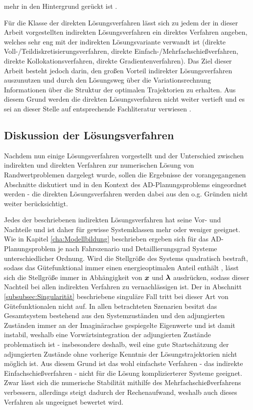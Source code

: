 mehr in den Hintergrund gerückt ist \cite{Papageorgiou.2012}. 

Für die Klasse der direkten Lösungsverfahren lässt sich zu jedem der in dieser Arbeit vorgestellten indirekten Lösungsverfahren ein direktes Verfahren angeben, welches sehr eng mit der indirekten Lösungsvariante verwandt ist (direkte Voll-/Teildiskretisierungsverfahren, direkte Einfach-/Mehrfachschießverfahren, direkte Kollokationsverfahren, direkte Gradientenverfahren). Das Ziel dieser Arbeit besteht jedoch darin, den großen Vorteil indirekter Lösungsverfahren auszunutzen und durch den Lösungsweg über die Variationsrechnung Informationen über die Struktur der optimalen Trajektorien zu erhalten. Aus diesem Grund werden die direkten Lösungsverfahren nicht weiter vertieft und es sei an dieser Stelle auf entsprechende Fachliteratur verwiesen \cite{KnutGraichen.2012,Gerdts.2010,Papageorgiou.2012,Ascher.1995c4,Ascher.1995c5,Betts.1998,Cervantes.2009}.
\subsection{Diskussion der Lösungsverfahren}\label{subsec:Diskussion}
Nachdem nun einige Lösungsverfahren vorgestellt und der Unterschied zwischen indirekten und direkten Verfahren zur numerischen Lösung von Randwertproblemen dargelegt wurde, sollen die Ergebnisse der vorangegangenen Abschnitte diskutiert und in den Kontext des \gls{AD}-Planungsproblems eingeordnet werden - die direkten Lösungsverfahren werden dabei aus den o.g. Gründen nicht weiter berücksichtigt. 

Jedes der beschriebenen indirekten Lösungsverfahren hat seine Vor- und Nachteile und ist daher für gewisse Systemklassen mehr oder weniger geeignet. Wie in Kapitel \ref{cha:Modellbildung} beschrieben ergeben sich für das \gls{AD}-Planungsproblem je nach Fahrszenario und Detaillierungsgrad Systeme unterschiedlicher Ordnung. Wird die Stellgröße des Systems quadratisch bestraft, sodass das Gütefunktional immer einen energieoptimalen Anteil enthält \cite{KnutGraichen.2012}, lässt sich die Stellgröße immer in Abhängigkeit von $\boldsymbol{x}$ und $\boldsymbol{\lambda}$ ausdrücken, sodass dieser Nachteil bei allen indirekten Verfahren zu vernachlässigen ist. Der in Abschnitt \ref{subsubsec:Singularität} beschriebene singuläre Fall tritt bei dieser Art von Gütefunktionalen nicht auf. In allen betrachteten Szenarien besitzt das Gesamtsystem bestehend aus den Systemzuständen und den adjungierten Zuständen immer an der Imaginärachse gespiegelte Eigenwerte und ist damit instabil, weshalb eine Vorwärtsintegration der adjungierten Zustände problematisch ist - insbesondere deshalb, weil eine gute Startschätzung der adjungierten Zustände ohne vorherige Kenntnis der Lösungstrajektorien nicht möglich ist. Aus diesem Grund ist das wohl einfachste Verfahren - das indirekte Einfachschießverfahren - nicht für die Lösung komplizierterer Systeme geeignet. Zwar lässt sich die numerische Stabilität mithilfe des Mehrfachschießverfahrens verbessern, allerdings steigt dadurch der Rechenaufwand, weshalb auch dieses Verfahren als ungeeignet bewertet wird. 

